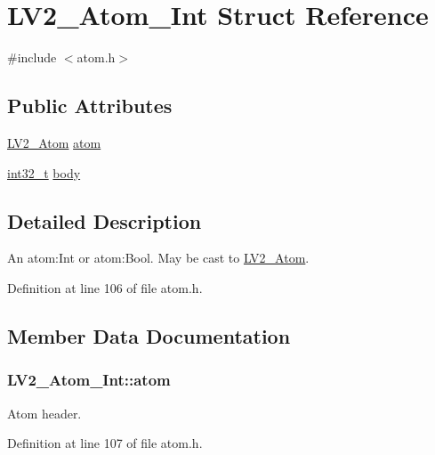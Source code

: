 \hypertarget{struct_l_v2___atom___int}{}\section{L\+V2\+\_\+\+Atom\+\_\+\+Int Struct Reference}
\label{struct_l_v2___atom___int}


{\ttfamily \#include $<$atom.\+h$>$}

\subsection*{Public Attributes}
\begin{DoxyCompactItemize}
\item 
\hyperlink{struct_l_v2___atom}{L\+V2\+\_\+\+Atom} \hyperlink{struct_l_v2___atom___int_a7b44df9a39a8647b7895822fbc29de94}{atom}
\item 
\hyperlink{lib-src_2ffmpeg_2win32_2stdint_8h_a37994e3b11c72957c6f454c6ec96d43d}{int32\+\_\+t} \hyperlink{struct_l_v2___atom___int_a7827960af4d61b2a758d5af28eaf51fc}{body}
\end{DoxyCompactItemize}


\subsection{Detailed Description}
An atom\+:Int or atom\+:Bool. May be cast to \hyperlink{struct_l_v2___atom}{L\+V2\+\_\+\+Atom}. 

Definition at line 106 of file atom.\+h.



\subsection{Member Data Documentation}
\subsubsection[{\texorpdfstring{atom}{atom}}]{ L\+V2\+\_\+\+Atom\+\_\+\+Int\+::atom}\hypertarget{struct_l_v2___atom___int_a7b44df9a39a8647b7895822fbc29de94}{}\label{struct_l_v2___atom___int_a7b44df9a39a8647b7895822fbc29de94}
Atom header. 

Definition at line 107 of file atom.\+h.

